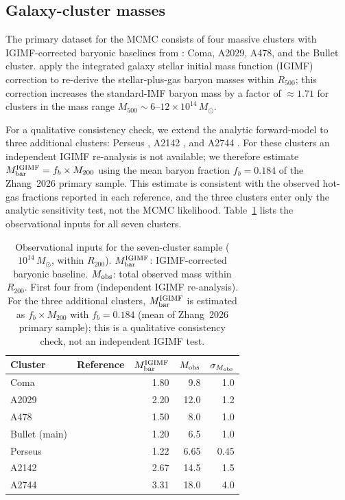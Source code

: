 \documentclass[12pt,a4paper]{article}
\begin{document}
\subsection{Galaxy-cluster masses}

The primary dataset for the MCMC consists of four massive clusters
with IGIMF-corrected baryonic baselines from \citet{Zhang2026}:
Coma, A2029, A478, and the Bullet cluster.
\citet{Zhang2026} apply the integrated galaxy stellar initial mass
function (IGIMF) correction to re-derive the stellar-plus-gas baryon
masses within $R_{500}$; this correction increases the
standard-IMF baryon mass by a factor of $\approx1.71$ for clusters in
the mass range $M_{500}\sim6$--$12\times10^{14}\,M_\odot$.

For a qualitative consistency check, we extend the analytic forward-model
to three additional clusters: Perseus \citep{Simionescu2011},
A2142 \citep{Tchernin2016}, and A2744 \citep{Merten2011,Owers2011}.
For these clusters an independent IGIMF re-analysis is not available;
we therefore estimate $M_{\rm bar}^{\rm IGIMF} = f_b \times M_{200}$
using the mean baryon fraction $f_b=0.184$ of the Zhang~2026 primary sample.
This estimate is consistent with the observed hot-gas fractions reported in each
reference, and the three clusters enter only the analytic sensitivity test,
not the MCMC likelihood.
Table~\ref{tab:cluster_data} lists the observational inputs for all seven clusters.

\begin{table}[H]
\centering
\caption{Observational inputs for the seven-cluster sample
($10^{14}\,M_\odot$, within $R_{200}$).
$M_{\rm bar}^{\rm IGIMF}$: IGIMF-corrected baryonic baseline.
$M_{\rm obs}$: total observed mass within $R_{200}$.
First four from \citet{Zhang2026} (independent IGIMF re-analysis).
For the three additional clusters, $M_{\rm bar}^{\rm IGIMF}$ is estimated
as $f_b \times M_{200}$ with $f_b=0.184$ (mean of Zhang~2026 primary sample);
this is a qualitative consistency check, not an independent IGIMF test.}
\label{tab:cluster_data}
\small
\begin{tabular}{llrrr}
\toprule
Cluster & Reference & $M_{\rm bar}^{\rm IGIMF}$ & $M_{\rm obs}$ & $\sigma_{M_{\rm obs}}$ \\
\midrule
Coma          & \citet{Zhang2026}      & 1.80 & 9.8  & 1.0 \\
A2029         & \citet{Zhang2026}      & 2.20 & 12.0 & 1.2 \\
A478          & \citet{Zhang2026}      & 1.50 & 8.0  & 1.0 \\
Bullet (main) & \citet{Zhang2026}      & 1.20 & 6.5  & 1.0 \\
Perseus       & \citet{Simionescu2011} & 1.22 & 6.65 & 0.45 \\
A2142         & \citet{Tchernin2016}   & 2.67 & 14.5 & 1.5  \\
A2744         & \citet{Merten2011}     & 3.31 & 18.0 & 4.0  \\
\bottomrule
\end{tabular}
\end{table}
\end{document}

